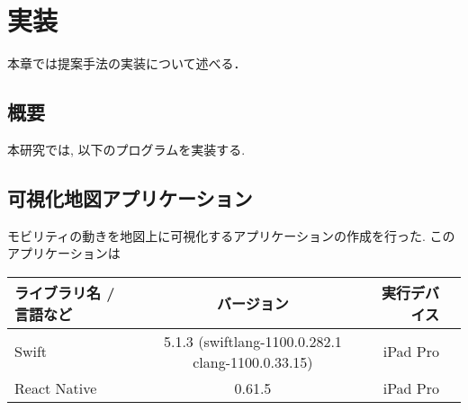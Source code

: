 \chapter{実装}
\label{implementation}

本章では提案手法の実装について述べる．

\section{概要}

本研究では, 以下のプログラムを実装する.

\section{可視化地図アプリケーション}

モビリティの動きを地図上に可視化するアプリケーションの作成を行った. このアプリケーションは



\begin{table}[htb]
    \centering
    \begin{tabular}{|l|c|r||r|} \hline 
      ライブラリ名 / 言語など & バージョン & 実行デバイス \\ \hline \hline
      Swift & 5.1.3 (swiftlang-1100.0.282.1 clang-1100.0.33.15) & iPad Pro \\ \hline
      React Native & 0.61.5 & iPad Pro  \\ \hline
    \end{tabular}
\end{table}

